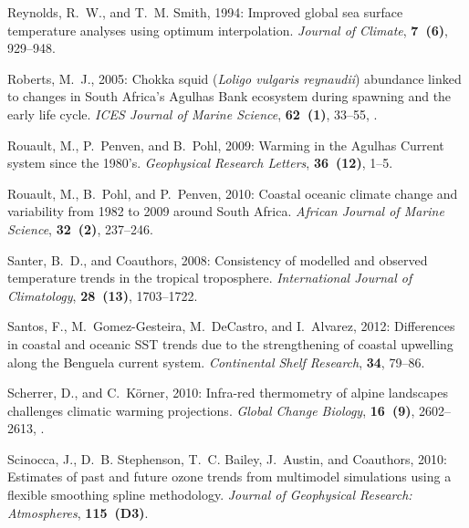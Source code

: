 \documentclass[twocol]{ametsoc}
\begin{document}
\begin{thebibliography}{41}
Reynolds, R.~W., and T.~M. Smith, 1994: {Improved global sea surface
  temperature analyses using optimum interpolation}. \textit{Journal of
  Climate}, \textbf{7~(6)}, 929--948.

Roberts, M.~J., 2005: {Chokka squid (\textit{Loligo vulgaris reynaudii}) abundance
  linked to changes in South Africa's Agulhas Bank ecosystem during spawning
  and the early life cycle}. \textit{ICES Journal of Marine Science},
  \textbf{62~(1)}, 33--55, .

Rouault, M., P.~Penven, and B.~Pohl, 2009: {Warming in the Agulhas Current
  system since the 1980's}. \textit{Geophysical Research Letters},
  \textbf{36~(12)}, 1--5.

Rouault, M., B.~Pohl, and P.~Penven, 2010: {Coastal oceanic climate change and
  variability from 1982 to 2009 around South Africa}. \textit{African Journal
  of Marine Science}, \textbf{32~(2)}, 237--246.

Santer, B.~D., and Coauthors, 2008: Consistency of modelled and observed
  temperature trends in the tropical troposphere. \textit{International Journal
  of Climatology}, \textbf{28~(13)}, 1703--1722.

Santos, F., M.~Gomez-Gesteira, M.~DeCastro, and I.~Alvarez, 2012: {Differences
  in coastal and oceanic SST trends due to the strengthening of coastal
  upwelling along the Benguela current system}. \textit{Continental Shelf
  Research}, \textbf{34}, 79--86.

Scherrer, D., and C.~K{\"{o}}rner, 2010: {Infra-red thermometry of alpine
  landscapes challenges climatic warming projections}. \textit{Global Change
  Biology}, \textbf{16~(9)}, 2602--2613,
  .

Scinocca, J., D.~B. Stephenson, T.~C. Bailey, J.~Austin, and Coauthors, 2010:
  Estimates of past and future ozone trends from multimodel simulations using a
  flexible smoothing spline methodology. \textit{Journal of Geophysical
  Research: Atmospheres}, \textbf{115~(D3)}.


\end{thebibliography}
\end{document}
